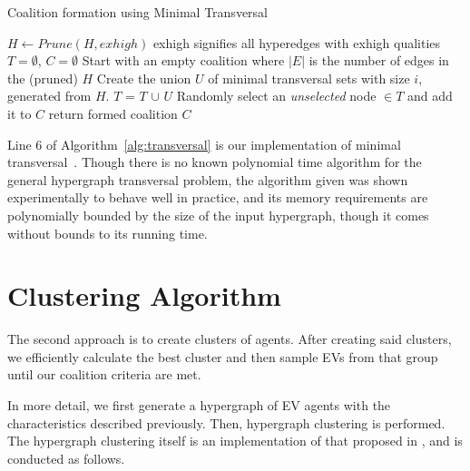 \begin{algorithm}
	\caption{Coalition formation using Minimal Transversal}\label{alg:transversal}
	\begin{algorithmic}[1]
		\State $H \gets Prune(H, exhigh)$ \Comment exhigh signifies all hyperedges with exhigh qualities
		\State $T= \emptyset$, $C = \emptyset$ \Comment Start with an empty coalition
		 \Comment where $|E|$ is the number of edges in the (pruned) $H$
		\State Create the union $U$ of minimal transversal sets with size $i$, generated from $H$.
		\State $T$ = $T$ $\cup$ $U$
		\State Randomly select an {\em unselected} node  $\in T $ and add it to $C$
		\EndWhile
		\State return formed coalition $C$
		\EndIf
		\EndFor
		\EndProcedure
	\end{algorithmic}
\end{algorithm}

Line 6 of Algorithm~\ref{alg:transversal} is our implementation of minimal transversal~\cite{eiter1995identifying}. Though there is no known polynomial time algorithm for the general hypergraph transversal problem, the algorithm given was shown experimentally to behave well in practice, and its memory requirements are polynomially bounded by the size of the input hypergraph, though it comes without bounds to its running time.

\section{Clustering Algorithm}\label{sec:Clustering}
The second approach is to create clusters of agents. After creating said clusters, we efficiently calculate the best cluster and then sample EVs from that group until our coalition criteria are met.

In more detail, we first generate a hypergraph of EV agents with the characteristics described previously. Then, hypergraph clustering is performed.
The hypergraph clustering itself is an implementation of that proposed in \cite{zhou2006learning}, and is conducted as follows. 	%

